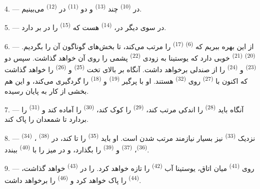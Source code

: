 4. --- در  \textsuperscript{(10)} چند 
\textsuperscript{(13)} و دو  \textsuperscript{(11)} در
 \textsuperscript{(12)} می‌بینیم.

5. --- در سوی دیگر در،  \textsuperscript{(14)}
هست که  \textsuperscript{(15)} را در بر دارد.

6. --- از این بهره ببریم که  \textsuperscript{(6)}
 \textsuperscript{(17)} را مرتب می‌کند، تا بخش‌های گوناگون
آن را بگردیم.  \textsuperscript{(20)}  \textsuperscript{(21)} خوبی دارد که یوستینا به زودی 
\textsuperscript{(22)} پشمی را روی آن خواهد گذاشت. سپس دو
 \textsuperscript{(23)} و 
\textsuperscript{(24)} را از صندلی برخواهد داشت. آنگاه بر بالای تخت
 \textsuperscript{(25)} و 
\textsuperscript{(26)} را خواهد گذاشت که اکنون با 
\textsuperscript{(27)} روی  \textsuperscript{(32)}
هستند. او با پرگیر  \textsuperscript{(19)} و
 \textsuperscript{(18)} را گردگیری می‌کند، و این هم
بخشی از کار به پایان رسیده.

7. --- آنگاه باید  \textsuperscript{(28)} را
اندکی مرتب کند،  \textsuperscript{(29)} را کوک کند،
 \textsuperscript{(30)} را آماده کند و
 \textsuperscript{(31)} را بردارد تا شمعدان را پاک کند.

\VUsaut{5.0mm}
\VUsaut{3.0mm}

8. ---  \textsuperscript{(34)} نزدیک 
\textsuperscript{(33)} نیز بسیار نیازمند مرتب شدن است. او باید
 \textsuperscript{(35)} را تا کند، در  \textsuperscript{(38)} ، 
\textsuperscript{(36)}،  \textsuperscript{(37)} و
 \textsuperscript{(39)} را بگذارد، و در میز را با
 \textsuperscript{(40)} ببندد.

9. --- روی  \textsuperscript{(41)} میان اتاق،
یوستینا آب  \textsuperscript{(42)} را تازه خواهد کرد.
 را در  \textsuperscript{(43)} خواهد
گذاشت،  \textsuperscript{(44)} را پاک خواهد کرد و
 \textsuperscript{(46)} را برخواهد داشت.

